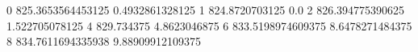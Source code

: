 0 825.3653564453125 0.4932861328125
1 824.8720703125 0.0
2 826.394775390625 1.522705078125
4 829.734375 4.8623046875
6 833.5198974609375 8.6478271484375
8 834.7611694335938 9.88909912109375
